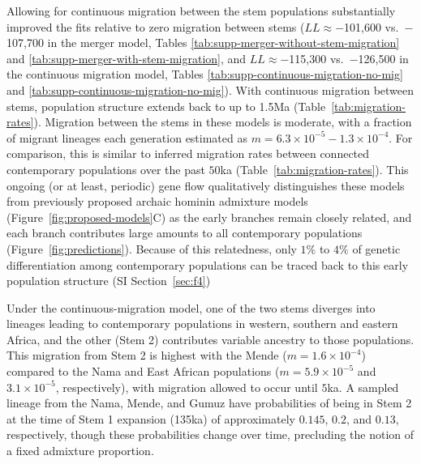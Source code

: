 \documentclass[]{article}
\begin{document}
Allowing for continuous migration between the stem populations substantially
improved the fits relative to zero migration between stems ($LL \approx
-$101,600 vs.\ $-$107,700 in the merger model, Tables
\ref{tab:supp-merger-without-stem-migration} and
\ref{tab:supp-merger-with-stem-migration}, and $LL \approx -$115,300 vs.\
$-$126,500 in the continuous migration model, Tables
\ref{tab:supp-continuous-migration-no-mig} and
\ref{tab:supp-continuous-migration-no-mig}).  With continuous migration between
stems, population structure extends back to up to 1.5Ma
(Table~\ref{tab:migration-rates}).  Migration between the stems in these models
is moderate, with a fraction of migrant lineages each generation estimated as
$m=6.3\times10^{-5}-1.3\times10^{-4}$. For comparison, this is similar to
inferred migration rates between connected contemporary populations over the
past $50$ka (Table~\ref{tab:migration-rates}). This ongoing (or at least,
periodic) gene flow qualitatively distinguishes these models from previously
proposed archaic hominin admixture models (Figure~\ref{fig:proposed-models}C)
as the early branches remain closely related, and each branch contributes large
amounts to all contemporary populations (Figure~\ref{fig:predictions}).
Because of this relatedness, only $1\%$ to $4\%$ of genetic differentiation
among contemporary populations can be traced back to this early population
structure (SI Section~\ref{sec:f4})
 
Under the continuous-migration model, one of the two stems diverges into
lineages leading to contemporary populations in western, southern and eastern
Africa, and the other (Stem 2) contributes variable ancestry to those
populations. This migration from Stem 2 is highest with the Mende
($m=1.6\times10^{-4}$) compared to the Nama and East African populations
($m=5.9\times10^{-5}$ and $3.1\times10^{-5}$, respectively), with migration
allowed to occur until $5$ka. A sampled lineage from the Nama, Mende, and Gumuz
have probabilities of being in Stem 2 at the time of Stem 1 expansion (135ka)
of approximately $0.145$, $0.2$, and $0.13$, respectively, though these
probabilities change over time, precluding the notion of a fixed admixture
proportion.
\end{document}
